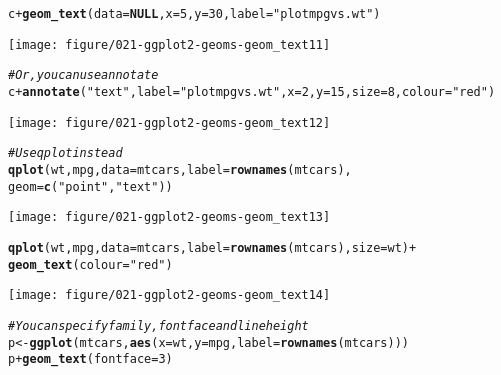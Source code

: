 \documentclass[a4paper,titlepage]{tufte-handout}\usepackage[]{graphicx}\usepackage[]{color}
\makeatletter
\def\maxwidth{ %
  \ifdim\Gin@nat@width>\linewidth
    \linewidth
  \else
    \Gin@nat@width
  \fi
}
\newcommand{\hlnum}[1]{\textcolor[rgb]{0.686,0.059,0.569}{#1}}%
\newcommand{\hlstr}[1]{\textcolor[rgb]{0.192,0.494,0.8}{#1}}%
\newcommand{\hlcom}[1]{\textcolor[rgb]{0.678,0.584,0.686}{\textit{#1}}}%
\newcommand{\hlopt}[1]{\textcolor[rgb]{0,0,0}{#1}}%
\newcommand{\hlstd}[1]{\textcolor[rgb]{0.345,0.345,0.345}{#1}}%
\newcommand{\hlkwa}[1]{\textcolor[rgb]{0.161,0.373,0.58}{\textbf{#1}}}%
\newcommand{\hlkwb}[1]{\textcolor[rgb]{0.69,0.353,0.396}{#1}}%
\newcommand{\hlkwc}[1]{\textcolor[rgb]{0.333,0.667,0.333}{#1}}%
\newcommand{\hlkwd}[1]{\textcolor[rgb]{0.737,0.353,0.396}{\textbf{#1}}}%
\newenvironment{kframe}{%
 \def\at@end@of@kframe{}%
 \ifinner\ifhmode%
  \def\at@end@of@kframe{\end{minipage}}%
  \begin{minipage}{\columnwidth}%
 \fi\fi%
 \def\FrameCommand##1{\hskip\@totalleftmargin \hskip-\fboxsep
 \colorbox{shadecolor}{##1}\hskip-\fboxsep
     \hskip-\linewidth \hskip-\@totalleftmargin \hskip\columnwidth}%
 \MakeFramed {\advance\hsize-\width
   \@totalleftmargin\z@ \linewidth\hsize
   \@setminipage}}%
 {\par\unskip\endMakeFramed%
 \at@end@of@kframe}
\newenvironment{knitrout}{}{} %
\makeatother
\begin{document}
\begin{knitrout}
\begin{kframe}
\begin{alltt}
\hlstd{c} \hlopt{+} \hlkwd{geom_text}\hlstd{(}\hlkwc{data} \hlstd{=} \hlkwa{NULL}\hlstd{,} \hlkwc{x} \hlstd{=} \hlnum{5}\hlstd{,} \hlkwc{y} \hlstd{=} \hlnum{30}\hlstd{,} \hlkwc{label} \hlstd{=} \hlstr{"plot mpg vs. wt"}\hlstd{)}
\end{alltt}
\end{kframe}
\texttt{[image: figure/021-ggplot2-geoms-geom\_text11]} 
\begin{kframe}\begin{alltt}
\hlcom{# Or, you can use annotate}
\hlstd{c} \hlopt{+} \hlkwd{annotate}\hlstd{(}\hlstr{"text"}\hlstd{,} \hlkwc{label} \hlstd{=} \hlstr{"plot mpg vs. wt"}\hlstd{,} \hlkwc{x} \hlstd{=} \hlnum{2}\hlstd{,} \hlkwc{y} \hlstd{=} \hlnum{15}\hlstd{,} \hlkwc{size} \hlstd{=} \hlnum{8}\hlstd{,} \hlkwc{colour} \hlstd{=} \hlstr{"red"}\hlstd{)}
\end{alltt}
\end{kframe}
\texttt{[image: figure/021-ggplot2-geoms-geom\_text12]} 
\begin{kframe}\begin{alltt}
\hlcom{# Use qplot instead}
\hlkwd{qplot}\hlstd{(wt, mpg,} \hlkwc{data} \hlstd{= mtcars,} \hlkwc{label} \hlstd{=} \hlkwd{rownames}\hlstd{(mtcars),}
   \hlkwc{geom}\hlstd{=}\hlkwd{c}\hlstd{(}\hlstr{"point"}\hlstd{,} \hlstr{"text"}\hlstd{))}
\end{alltt}
\end{kframe}
\texttt{[image: figure/021-ggplot2-geoms-geom\_text13]} 
\begin{kframe}\begin{alltt}
\hlkwd{qplot}\hlstd{(wt, mpg,} \hlkwc{data} \hlstd{= mtcars,} \hlkwc{label} \hlstd{=} \hlkwd{rownames}\hlstd{(mtcars),} \hlkwc{size} \hlstd{= wt)} \hlopt{+}
  \hlkwd{geom_text}\hlstd{(}\hlkwc{colour} \hlstd{=} \hlstr{"red"}\hlstd{)}
\end{alltt}
\end{kframe}
\texttt{[image: figure/021-ggplot2-geoms-geom\_text14]} 
\begin{kframe}\begin{alltt}
\hlcom{# You can specify family, fontface and lineheight}
\hlstd{p} \hlkwb{<-} \hlkwd{ggplot}\hlstd{(mtcars,} \hlkwd{aes}\hlstd{(}\hlkwc{x}\hlstd{=wt,} \hlkwc{y}\hlstd{=mpg,} \hlkwc{label}\hlstd{=}\hlkwd{rownames}\hlstd{(mtcars)))}
\hlstd{p} \hlopt{+} \hlkwd{geom_text}\hlstd{(}\hlkwc{fontface}\hlstd{=}\hlnum{3}\hlstd{)}
\end{alltt}
\end{kframe}

\end{knitrout}
\end{document}
